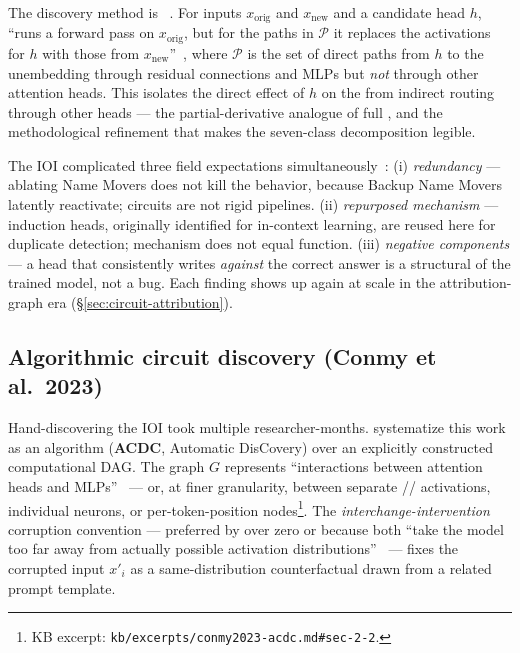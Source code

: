 The discovery method is \emph{}~\citep[\S 3.1]{wang2022-ioi}.
For inputs $x_{\text{orig}}$ and $x_{\text{new}}$ and a candidate head
$h$,  ``runs a forward pass on $x_{\text{orig}}$, but for
the paths in $\mathcal{P}$ it replaces the activations for $h$ with
those from $x_{\text{new}}$''~\citep[\S 3.1]{wang2022-ioi}, where
$\mathcal{P}$ is the set of direct paths from $h$ to the unembedding
through residual connections and MLPs but \emph{not} through other
attention heads. This isolates the direct effect of $h$ on the 
from indirect routing through other heads --- the partial-derivative
analogue of full , and the methodological refinement
that makes the seven-class decomposition legible.

The IOI  complicated three field expectations
simultaneously~\citep[\S 3]{wang2022-ioi}:
(i) \emph{redundancy} --- ablating Name Movers does not kill the
behavior, because Backup Name Movers latently reactivate; circuits are
not rigid pipelines.
(ii) \emph{repurposed mechanism} --- induction heads, originally
identified for in-context learning, are reused here for duplicate
detection; mechanism does not equal function.
(iii) \emph{negative components} --- a head that consistently writes
\emph{against} the correct answer is a structural  of the
trained model, not a bug. Each finding shows up again at scale in the
attribution-graph era (\S\ref{sec:circuit-attribution}).

\subsection{Algorithmic circuit discovery (Conmy et al.\ 2023)}
\label{sec:circuit-acdc}

Hand-discovering the IOI  took multiple researcher-months.
\citet{conmy2023-acdc} systematize this work as an algorithm
(\textbf{ACDC}, Automatic  DisCovery) over an explicitly
constructed computational DAG. The graph $G$ represents ``interactions
between attention heads and MLPs''~\citep[\S 2.2]{conmy2023-acdc} ---
or, at finer granularity, between separate // activations,
individual neurons, or per-token-position
nodes\footnote{KB excerpt:
\nolinkurl{kb/excerpts/conmy2023-acdc.md#sec-2-2}.}. The
\emph{interchange-intervention} corruption convention --- preferred by
\citet{conmy2023-acdc} over zero or  because both ``take
the model too far away from actually possible activation
distributions''~\citep[\S 2.3]{conmy2023-acdc} --- fixes the corrupted
input $x'_i$ as a same-distribution counterfactual drawn from a
related prompt template.

